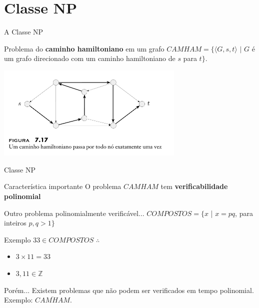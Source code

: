 \documentclass[xcolor=dvipsnames,table]{beamer}
\begin{document}
	\section{Classe NP}				
	
	\begin{frame}{A Classe NP}
		\begin{block}{Problema do {\bf caminho hamiltoniano} em um grafo}
			$CAMHAM = \{ \langle G, s, t \rangle \mbox{ | } G$ é um grafo direcionado com um caminho hamiltoniano de $s$ para $t \}$.
		\end{block}
		\begin{center}
			\includegraphics[width=9cm]{images/camHam.png}
		\end{center}
	\end{frame}	
	
	\begin{frame}[shrink]{Classe NP}
		\begin{block}{Característica importante}
			O problema $CAMHAM$ tem {\bf verificabilidade polinomial}
		\end{block} \pause
		\begin{block}{Outro problema polinomialmente verificável...}
			$COMPOSTOS = \{ x$ | $x = pq$, para inteiros $p,q > 1 \}$
		\end{block} \pause
		\begin{exampleblock}{Exemplo}
			$33 \in COMPOSTOS$ $\therefore$ \pause
			\begin{itemize}
				\item $3 \times 11 = 33$
				\item $3, 11 \in \mathbb{Z}$
			\end{itemize}
		\end{exampleblock} \pause
		\begin{alertblock}{Porém...}
			Existem problemas que não podem ser verificados em tempo polinomial. Exemplo: $\overline{CAMHAM}$.
		\end{alertblock}
	\end{frame}
	
\end{document}

